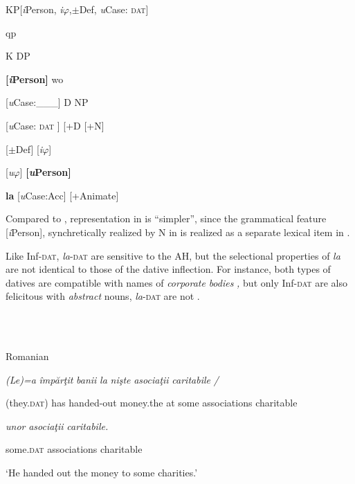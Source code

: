 \documentclass[output=paper,colorlinks,citecolor=brown]{./langscibook}
\begin{document}
            

KP[\textit{i}Person, \textit{i}${\varphi}$,${\pm}$Def, \textit{u}Case: \textsc{dat}]

qp

  K            DP

\textbf{[\textit{i}}\textbf{Person]}       wo

  [\textit{u}Case:\_\_\_]    D    NP

   [\textit{u}Case: \textsc{dat} ]  [+D    [+N]

    {\textbar}    [${\pm}$Def]  [\textit{i}${\varphi}$]

    {\textbar}    [\textit{u}${\varphi}$]    \textbf{[\textit{u}}\textbf{Person]}

    \textbf{la}    [\textit{u}Case:Acc]  [+Animate]

Compared to , representation in  is “simpler”, since the grammatical feature [\textit{i}Person], synchretically realized by N in  is realized as a separate lexical item in . 

Like Inf-\textsc{dat}, \textit{la}{}-\textsc{dat} are sensitive to the AH, but the selectional properties of \textit{la} are not identical to those of the dative inflection. For instance, both types of datives are compatible with names of \textit{corporate} \textit{bodies} \textit{,} but only Inf-\textsc{dat} are also felicitous with \textit{abstract} nouns, \textit{la}{}-\textsc{dat} are not .

\ea%
    \label{ex:key:18}
    \gll\\
        \\
    \glt
    \z

          Romanian

\textit{(Le)=a}   \textit{împărţit}    \textit{banii}  \textit{la} \textit{nişte}    \textit{asociaţii} \textit{caritabile} \textit{/}

  (they.\textsc{dat}) has handed-out  money.the at some    associations charitable

  \textit{unor}    \textit{asociaţii}  \textit{caritabile.}

some.\textsc{dat}  associations   charitable

  ‘He handed out the money to some charities.’

\ea%
    \label{ex:key:19}
    \gll\\
        \\
    \glt
    \z
\end{document}

